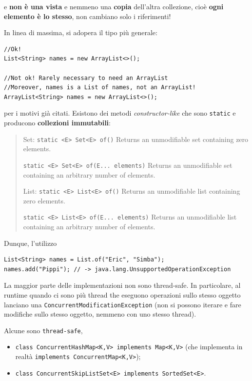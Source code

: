 \documentclass[\fontsizeclass,twocolumn]{\classname}
\theoremstyle{definition}
\theoremstyle{definition}
\begin{document}
e \textbf{non è una vista} e nemmeno una \textbf{copia} dell'altra collezione,
cioè \textbf{ogni elemento è lo stesso}, non cambiano solo i riferimenti!

In linea di massima, si adopera il tipo più generale:

\begin{lstlisting}
//Ok!
List<String> names = new ArrayList<>();

//Not ok! Rarely necessary to need an ArrayList
//Moreover, names is a List of names, not an ArrayList!
ArrayList<String> names = new ArrayList<>();
\end{lstlisting}

per i motivi già citati. Esistono dei metodi \emph{constructor\--like} che sono
\texttt{static} e producono \textbf{collezioni immutabili}:
\begin{quote}
    \footnotesize{Set:
\texttt{static <E> Set<E> 	of()} 	Returns an unmodifiable set containing zero elements.

\texttt{static <E> Set<E> 	of(E... elements)} 	Returns an unmodifiable set containing an arbitrary number of elements.

List:
\texttt{static <E> List<E> 	of()} 	Returns an unmodifiable list containing zero elements.

\texttt{static <E> List<E> 	of(E... elements)} 	Returns an unmodifiable list containing an arbitrary number of elements.}
\end{quote}

Dunque, l'utilizzo

\begin{lstlisting}
List<String> names = List.of("Eric", "Simba");
names.add("Pippi"); // -> java.lang.UnsupportedOperationException
\end{lstlisting}

La maggior parte delle implementazioni non sono thread\--safe. In particolare,
al runtime quando ci sono più thread the eseguono operazioni sullo stesso
oggetto lanciano una \texttt{ConcurrentModificationException} (non si possono
iterare e fare modifiche sullo stesso oggetto, nemmeno con uno stesso thread).

Alcune sono \texttt{thread\--safe},
\begin{itemize}
    \item \texttt{class ConcurrentHashMap<K,V> implements Map<K,V>} (che
        implementa in realtà \texttt{implements ConcurrentMap<K,V>});
    \item \texttt{class ConcurrentSkipListSet<E> implements SortedSet<E>}.
\end{itemize}
\end{document}
